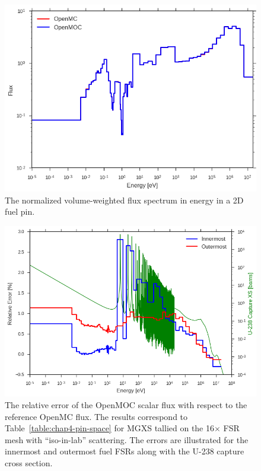 \begin{figure}[h!]
  \centering
  \includegraphics[width=0.9\linewidth]{figures/biases/pin-cell/vol-avg-flux}
\caption[Flux spectrum in a 2D fuel pin.]{The normalized volume-weighted flux spectrum in energy in a 2D fuel pin.}
\label{fig:chap4-pin-flux}
\end{figure}

\begin{figure}[H]
  \centering
  \includegraphics[width=0.85\linewidth]{figures/biases/pin-cell/rel-err-inner-outer}
\caption[Flux relative error by group for a 2D fuel pin.]{The relative error of the OpenMOC scalar flux with respect to the reference OpenMC flux. The results correspond to Table~\ref{table:chap4-pin-space} for \ac{MGXS} tallied on the 16$\times$ \ac{FSR} mesh with ``iso-in-lab'' scattering. The errors are illustrated for the innermost and outermost fuel \ac{FSR}s along with the U-238 capture cross section.}
\label{fig:chap4-pin-rel-err}
\end{figure}

